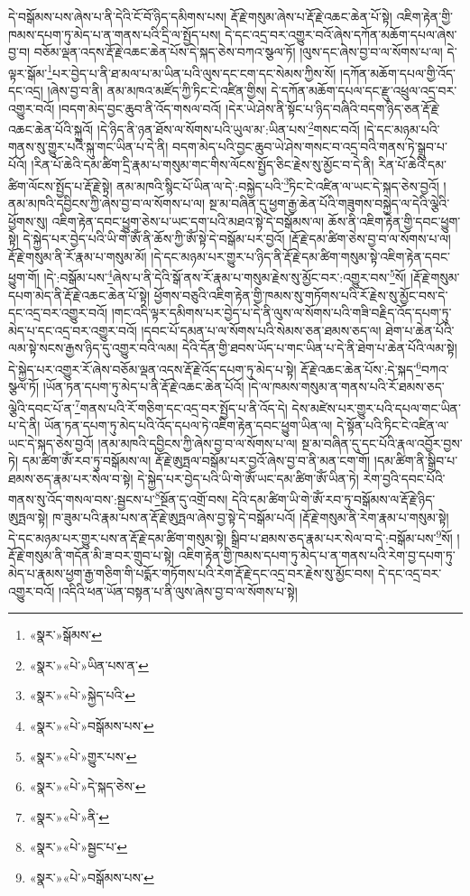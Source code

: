 དེ་བསྒོམས་པས་ཞེས་པ་ནི་དེའི་ངོ་བོ་ཉིད་དམིགས་པས། རྡོ་རྗེ་གསུམ་ཞེས་པ་རྡོ་རྗེ་འཆང་ཆེན་པོ་སྟེ། འཇིག་རྟེན་གྱི་ཁམས་དཔག་ཏུ་མེད་པ་ན་གནས་པའི་དྲི་ལ་སྤྱོད་པས། དེ་དང་འདྲ་བར་འགྱུར་བའོ་ཞེས་དཀོན་མཆོག་དཔལ་ཞེས་བྱ་བ། བཅོམ་ལྡན་འདས་རྡོ་རྗེ་འཆང་ཆེན་པོས་དེ་སྐད་ཅེས་བཀའ་སྩལ་ཏོ། །ལུས་དང་ཞེས་བྱ་བ་ལ་སོགས་པ་ལ། དེ་ལྟར་སྒོམ་\footnote{«སྣར་»སྒོམས་}པར་བྱེད་པ་ནི་ཐ་མལ་པ་མ་ཡིན་པའི་ལུས་དང་ངག་དང་སེམས་ཀྱིས་སོ། །དཀོན་མཆོག་དཔལ་གྱི་འོད་དང་འདྲ། །ཞེས་བྱ་བ་ནི། ནམ་མཁའ་མཛོད་ཀྱི་ཏིང་ངེ་འཛིན་གྱིས། དེ་དཀོན་མཆོག་དཔལ་དང་རྫུ་འཕྲུལ་འདྲ་བར་འགྱུར་བའོ། །བདག་མེད་བྱང་ཆུབ་ནི་འོད་གསལ་བའོ། །དེར་ཡེ་ཤེས་ནི་སྟོང་པ་ཉིད་བཞིའི་བདག་ཉིད་ཅན་རྡོ་རྗེ་འཆང་ཆེན་པོའི་སྐུའོ། །དེ་ཉིད་ནི་ཉན་ཐོས་ལ་སོགས་པའི་ཡུལ་མ་:ཡིན་པས་\footnote{«སྣར་»«པེ་»ཡིན་པས་ན་}གསང་བའོ། །དེ་དང་མཉམ་པའི་གནས་སུ་གྱུར་པའི་སྐུ་གང་ཡིན་པ་དེ་ནི། བདག་མེད་པའི་བྱང་ཆུབ་ཡེ་ཤེས་གསང་བ་འདྲ་བའི་གནས་ཏེ་སྒྲུབ་པ་པོའོ། །རིན་པོ་ཆེའི་དམ་ཚིག་དྲི་རྣམ་པ་གསུམ་གང་གིས་ལོངས་སྤྱོད་ཅིང་རྗེས་སུ་མྱོང་བ་དེ་ནི། རིན་པོ་ཆེའི་དམ་ཚིག་ལོངས་སྤྱོད་པ་རྡོ་རྗེ་སྟེ། ནམ་མཁའི་སྙིང་པོ་ཡིན་ལ་དེ་:བསྐྱེད་པའི་\footnote{«སྣར་»«པེ་»སྐྱེད་པའི་}ཏིང་ངེ་འཛིན་ལ་ཡང་དེ་སྐད་ཅེས་བྱའོ། །ནམ་མཁའི་དབྱིངས་ཀྱི་ཞེས་བྱ་བ་ལ་སོགས་པ་ལ། སྔ་མ་བཞིན་དུ་ཕྱག་རྒྱ་ཆེན་པོའི་གཟུགས་བསྐྱེད་ལ་དེའི་ལྕེའི་ཕྱོགས་སུ། འཇིག་རྟེན་དབང་ཕྱུག་ཅེས་པ་ཡང་དག་པའི་མཐའ་སྟེ་དེ་བསྒོམས་ལ། ཆོས་ནི་འཇིག་རྟེན་གྱི་དབང་ཕྱུག་སྟེ། དེ་སྐྱེད་པར་བྱེད་པའི་ཡི་གེ་ཨོཾ་ནི་ཆོས་ཀྱི་ཨོཾ་སྟེ་དེ་བསྒོམ་པར་བྱའོ། །རྡོ་རྗེ་དམ་ཚིག་ཅེས་བྱ་བ་ལ་སོགས་པ་ལ། རྡོ་རྗེ་གསུམ་ནི་རོ་རྣམ་པ་གསུམ་མོ། །དེ་དང་མཉམ་པར་གྱུར་པ་ཉིད་ནི་རྡོ་རྗེ་དམ་ཚིག་གསུམ་སྟེ་འཇིག་རྟེན་དབང་ཕྱུག་གོ། །དེ་:བསྒོམ་པས་\footnote{«སྣར་»«པེ་»བསྒོམས་པས་}ཞེས་པ་ནི་དེའི་སྒོ་ནས་རོ་རྣམ་པ་གསུམ་རྗེས་སུ་མྱོང་བར་:འགྱུར་བས་\footnote{«སྣར་»«པེ་»གྱུར་པས་}སོ། །རྡོ་རྗེ་གསུམ་དཔག་མེད་ནི་རྡོ་རྗེ་འཆང་ཆེན་པོ་སྟེ། ཕྱོགས་བཅུའི་འཇིག་རྟེན་གྱི་ཁམས་སུ་གཏོགས་པའི་རོ་རྗེས་སུ་མྱོང་བས་དེ་དང་འདྲ་བར་འགྱུར་བའོ། །གང་འདི་ལྟར་དམིགས་པར་བྱེད་པ་དེ་ནི་ལུས་ལ་སོགས་པའི་གཟི་བརྗིད་འོད་དཔག་ཏུ་མེད་པ་དང་འདྲ་བར་འགྱུར་བའོ། །དབང་པོ་དམན་པ་ལ་སོགས་པའི་སེམས་ཅན་ཐམས་ཅད་ལ། ཐེག་པ་ཆེན་པོའི་ལམ་སྟེ་སངས་རྒྱས་ཉིད་དུ་འགྱུར་བའི་ལམ། དེའི་དོན་གྱི་ཐབས་ཡོད་པ་གང་ཡིན་པ་དེ་ནི་ཐེག་པ་ཆེན་པོའི་ལམ་སྟེ། དེ་སྐྱེད་པར་འགྱུར་རོ་ཞེས་བཅོམ་ལྡན་འདས་རྡོ་རྗེ་འོད་དཔག་ཏུ་མེད་པ་སྟེ། རྡོ་རྗེ་འཆང་ཆེན་པོས་:དེ་སྐད་\footnote{«སྣར་»«པེ་»དེ་སྐད་ཅེས་}བཀའ་སྩལ་ཏོ། །ཡོན་ཏན་དཔག་ཏུ་མེད་པ་ནི་རྡོ་རྗེ་འཆང་ཆེན་པོའོ། །དེ་ལ་ཁམས་གསུམ་ན་གནས་པའི་རོ་ཐམས་ཅད་ལྕེའི་དབང་པོ་ན་\footnote{«སྣར་»«པེ་»ནི་}གནས་པའི་རོ་གཅིག་དང་འདྲ་བར་སྤྱོད་པ་ནི་འོད་དེ། དེས་མཛེས་པར་གྱུར་པའི་དཔལ་གང་ཡིན་པ་དེ་ནི། ཡོན་ཏན་དཔག་ཏུ་མེད་པའི་འོད་དཔལ་ཏེ་འཇིག་རྟེན་དབང་ཕྱུག་ཡིན་ལ། དེ་སྟོན་པའི་ཏིང་ངེ་འཛིན་ལ་ཡང་དེ་སྐད་ཅེས་བྱའོ། །ནམ་མཁའི་དབྱིངས་ཀྱི་ཞེས་བྱ་བ་ལ་སོགས་པ་ལ། སྔ་མ་བཞིན་དུ་དང་པོའི་རྣལ་འབྱོར་བྱས་ཏེ། དམ་ཚིག་ཨོཾ་རབ་ཏུ་བསྒོམས་ལ། རྡོ་རྗེ་ཨུཏྤལ་བསྒོམ་པར་བྱའོ་ཞེས་བྱ་བ་ནི་མན་ངག་གོ། །དམ་ཚིག་ནི་སྒྲིབ་པ་ཐམས་ཅད་རྣམ་པར་སེལ་བ་སྟེ། དེ་སྐྱེད་པར་བྱེད་པའི་ཡི་གེ་ཨོཾ་ཡང་དམ་ཚིག་ཨོཾ་ཡིན་ཏེ། རེག་བྱའི་དབང་པོའི་གནས་སུ་འོད་གསལ་བས་:སྦྱངས་པ་\footnote{«སྣར་»«པེ་»སྦྱང་པ་}སྔོན་དུ་འགྲོ་བས། དེའི་དམ་ཚིག་ཡི་གེ་ཨོཾ་རབ་ཏུ་བསྒོམས་ལ་རྡོ་རྗེ་ཉིད་ཨུཏྤལ་སྟེ། ཁ་ཟུམ་པའི་རྣམ་པས་ན་རྡོ་རྗེ་ཨུཏྤལ་ཞེས་བྱ་སྟེ་དེ་བསྒོམ་པའོ། །རྡོ་རྗེ་གསུམ་ནི་རེག་རྣམ་པ་གསུམ་སྟེ། དེ་དང་མཉམ་པར་གྱུར་པས་ན་རྡོ་རྗེ་དམ་ཚིག་གསུམ་སྟེ། སྒྲིབ་པ་ཐམས་ཅད་རྣམ་པར་སེལ་བ་དེ་:བསྒོམ་པས་\footnote{«སྣར་»«པེ་»བསྒོམས་པས་}སོ། །རྡོ་རྗེ་གསུམ་ནི་གདོན་མི་ཟ་བར་གྲུབ་པ་སྟེ། འཇིག་རྟེན་གྱི་ཁམས་དཔག་ཏུ་མེད་པ་ན་གནས་པའི་རེག་བྱ་དཔག་ཏུ་མེད་པ་རྣམས་ཕྱག་རྒྱ་གཅིག་གི་པདྨོར་གཏོགས་པའི་རེག་རྡོ་རྗེ་དང་འདྲ་བར་རྗེས་སུ་མྱོང་བས། དེ་དང་འདྲ་བར་འགྱུར་བའོ། །འདིའི་ཕན་ཡོན་བསྟན་པ་ནི་ལུས་ཞེས་བྱ་བ་ལ་སོགས་པ་སྟེ། 